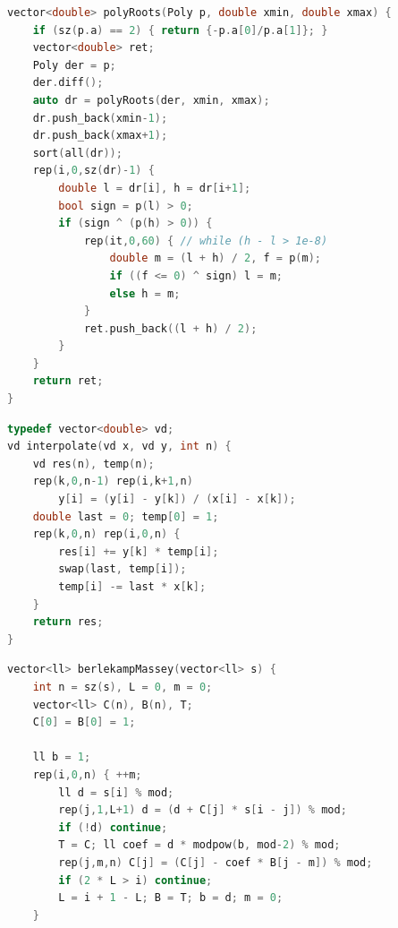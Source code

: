 \begin{multicols}{\Columns}
\begin{lstlisting}[language=C++]
vector<double> polyRoots(Poly p, double xmin, double xmax) {
	if (sz(p.a) == 2) { return {-p.a[0]/p.a[1]}; }
	vector<double> ret;
	Poly der = p;
	der.diff();
	auto dr = polyRoots(der, xmin, xmax);
	dr.push_back(xmin-1);
	dr.push_back(xmax+1);
	sort(all(dr));
	rep(i,0,sz(dr)-1) {
		double l = dr[i], h = dr[i+1];
		bool sign = p(l) > 0;
		if (sign ^ (p(h) > 0)) {
			rep(it,0,60) { // while (h - l > 1e-8)
				double m = (l + h) / 2, f = p(m);
				if ((f <= 0) ^ sign) l = m;
				else h = m;
			}
			ret.push_back((l + h) / 2);
		}
	}
	return ret;
}
\end{lstlisting}

\begin{lstlisting}[language=C++]
typedef vector<double> vd;
vd interpolate(vd x, vd y, int n) {
	vd res(n), temp(n);
	rep(k,0,n-1) rep(i,k+1,n)
		y[i] = (y[i] - y[k]) / (x[i] - x[k]);
	double last = 0; temp[0] = 1;
	rep(k,0,n) rep(i,0,n) {
		res[i] += y[k] * temp[i];
		swap(last, temp[i]);
		temp[i] -= last * x[k];
	}
	return res;
}
\end{lstlisting}

\begin{lstlisting}[language=C++]
vector<ll> berlekampMassey(vector<ll> s) {
	int n = sz(s), L = 0, m = 0;
	vector<ll> C(n), B(n), T;
	C[0] = B[0] = 1;

	ll b = 1;
	rep(i,0,n) { ++m;
		ll d = s[i] % mod;
		rep(j,1,L+1) d = (d + C[j] * s[i - j]) % mod;
		if (!d) continue;
		T = C; ll coef = d * modpow(b, mod-2) % mod;
		rep(j,m,n) C[j] = (C[j] - coef * B[j - m]) % mod;
		if (2 * L > i) continue;
		L = i + 1 - L; B = T; b = d; m = 0;
	}


\end{lstlisting}
\end{multicols}
